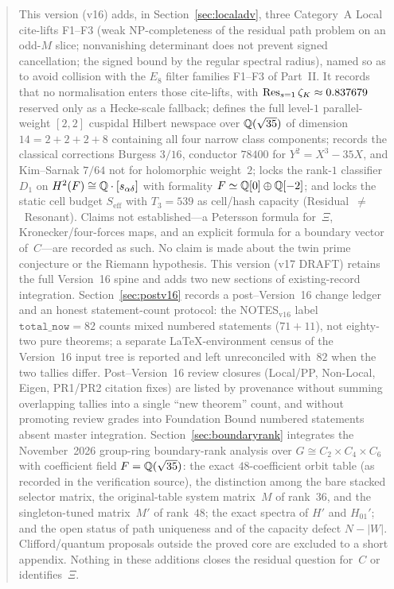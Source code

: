 \begin{abstract}
This version (v16) adds, in Section~\ref{sec:localadv}, three Category~A Local cite-lifts F1--F3 (weak NP-completeness of the residual path problem on an odd-$M$ slice; nonvanishing determinant does not prevent signed cancellation; the signed bound by the regular spectral radius), named so as to avoid collision with the $E_8$ filter families F1--F3 of Part~II. It records that no normalisation enters those cite-lifts, with $\Res_{s=1}\zeta_K\approx0.837679$ reserved only as a Hecke-scale fallback; defines the full level-$1$ parallel-weight $[2,2]$ cuspidal Hilbert newspace over $\Q(\sqrt{35})$ of dimension $14=2+2+2+8$ containing all four narrow class components; records the classical corrections Burgess $3/16$, conductor $78400$ for $Y^2=X^3-35X$, and Kim--Sarnak $7/64$ not for holomorphic weight~$2$; locks the rank-$1$ classifier $D_1$ on $H^2(F)\cong\Q\cdot[s_{\alpha\delta}]$ with formality $F\simeq\Q[0]\oplus\Q[-2]$; and locks the static cell budget $S_{\mathrm{eff}}$ with $T_3=539$ as cell/hash capacity (Residual~$\neq$~Resonant). Claims not established---a Petersson formula for~$\Xi$, Kronecker/four-forces maps, and an explicit formula for a boundary vector of~$C$---are recorded as such. No claim is made about the twin prime conjecture or the Riemann hypothesis.
This version (v17 DRAFT) retains the full Version~16 spine and adds two new sections of existing-record integration.
Section~\ref{sec:postv16} records a post--Version~16 change ledger and an honest statement-count protocol: the NOTES$_\mathrm{v16}$ label $\mathtt{total\_now}=82$ counts mixed numbered statements ($71+11$), not eighty-two pure theorems; a separate LaTeX-environment census of the Version~16 input tree is reported and left unreconciled with~$82$ when the two tallies differ. Post--Version~16 review closures (Local/PP, Non-Local, Eigen, PR1/PR2 citation fixes) are listed by provenance without summing overlapping tallies into a single ``new theorem'' count, and without promoting review grades into Foundation Bound numbered statements absent master integration.
Section~\ref{sec:boundaryrank} integrates the November~2026 group-ring boundary-rank analysis over $G\cong C_2\times C_4\times C_6$ with coefficient field $F=\Q(\sqrt{35})$: the exact $48$-coefficient orbit table (as recorded in the verification source), the distinction among the bare stacked selector matrix, the original-table system matrix~$M$ of rank~$36$, and the singleton-tuned matrix~$M'$ of rank~$48$; the exact spectra of $H'$ and $H_{01}'$; and the open status of path uniqueness and of the capacity defect $N-|W|$. Clifford/quantum proposals outside the proved core are excluded to a short appendix. Nothing in these additions closes the residual question for~$C$ or identifies~$\Xi$.
\end{abstract}
\tableofcontents
\clearpage

